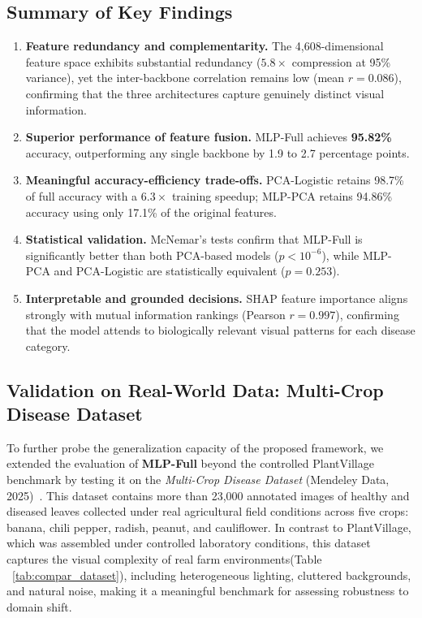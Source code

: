 \documentclass[pdflatex,sn-basic]{sn-jnl}
\begin{document}
\subsection{Summary of Key Findings}
\label{subsec:summary_findings}

\begin{enumerate}
    \item \textbf{Feature redundancy and complementarity.} The 4,608-dimensional feature space exhibits substantial redundancy ($5.8\times$ compression at 95\% variance), yet the inter-backbone correlation remains low (mean $r = 0.086$), confirming that the three architectures capture genuinely distinct visual information.
    \item \textbf{Superior performance of feature fusion.} MLP-Full achieves \textbf{95.82\%} accuracy, outperforming any single backbone by 1.9 to 2.7 percentage points.
    \item \textbf{Meaningful accuracy-efficiency trade-offs.} PCA-Logistic retains 98.7\% of full accuracy with a $6.3\times$ training speedup; MLP-PCA retains 94.86\% accuracy using only 17.1\% of the original features.
    \item \textbf{Statistical validation.} McNemar's tests confirm that MLP-Full is significantly better than both PCA-based models ($p < 10^{-6}$), while MLP-PCA and PCA-Logistic are statistically equivalent ($p = 0.253$).
    \item \textbf{Interpretable and grounded decisions.} SHAP feature importance aligns strongly with mutual information rankings (Pearson $r = 0.997$), confirming that the model attends to biologically relevant visual patterns for each disease category.
\end{enumerate}

\subsection{Validation on Real-World Data: Multi-Crop Disease Dataset}
\label{subsec:multicrop}

To further probe the generalization capacity of the proposed framework, we extended the evaluation of \textbf{MLP-Full} beyond the controlled PlantVillage benchmark by testing it on the \textit{Multi-Crop Disease Dataset} (Mendeley Data, 2025)~\cite{PremKumar2025_MultiCrop}. This dataset contains more than 23,000 annotated images of healthy and diseased leaves collected under real agricultural field conditions across five crops: banana, chili pepper, radish, peanut, and cauliflower. In contrast to PlantVillage, which was assembled under controlled laboratory conditions, this dataset captures the visual complexity of real farm environments(Table ~\ref{tab:compar_dataset}), including heterogeneous lighting, cluttered backgrounds, and natural noise, making it a meaningful benchmark for assessing robustness to domain shift.
\end{document}
